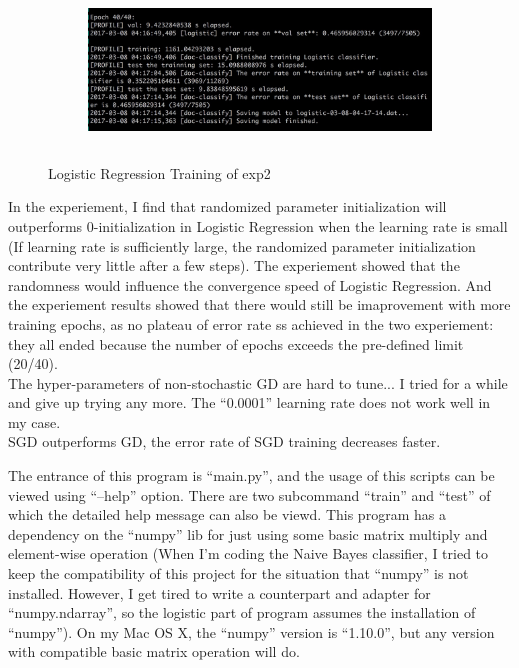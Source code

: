 \documentclass{article}
\theoremstyle{definition}
\theoremstyle{definition}
\theoremstyle{remark}
\begin{document}
\begin{addmargin}[3em]{2em}
\begin{figure}[!tbp]
    \vspace{2em}

    \begin{subfigure}[b]{\columnwidth}
      \centering
      \includegraphics[height=4cm]{lr_run2.jpeg}
    \end{subfigure}

    \caption{Logistic Regression Training of exp2}
  \end{figure}

  In the experiement, I find that randomized parameter initialization will outperforms 0-initialization in Logistic Regression when the learning rate is small (If learning rate is sufficiently large, the randomized parameter initialization contribute very little after a few steps). The experiement showed that the randomness would influence the convergence speed of Logistic Regression. And the experiement results showed that there would still be imaprovement with more training epochs, as no plateau of error rate ss achieved in the two experiement: they all ended because the number of epochs exceeds the pre-defined limit (20/40).\\

  The hyper-parameters of non-stochastic GD are hard to tune... I tried for a while and give up trying any more. The ``0.0001'' learning rate does not work well in my case.\\

  SGD outperforms GD, the error rate of SGD training decreases faster.

  The entrance of this program is ``main.py'', and the usage of this scripts can be viewed using ``--help'' option. There are two subcommand ``train'' and ``test'' of which the detailed help message can also be viewd. This program has a dependency on the ``numpy'' lib for just using some basic matrix multiply and element-wise operation (When I'm coding the Naive Bayes classifier, I tried to keep the compatibility of this project for the situation that ``numpy'' is not installed. However, I get tired to write a counterpart and adapter for ``numpy.ndarray'', so the logistic part of program assumes the installation of ``numpy''). On my Mac OS X, the ``numpy'' version is ``1.10.0'', but any version with compatible basic matrix operation will do.\\


\end{addmargin}
\end{document}
